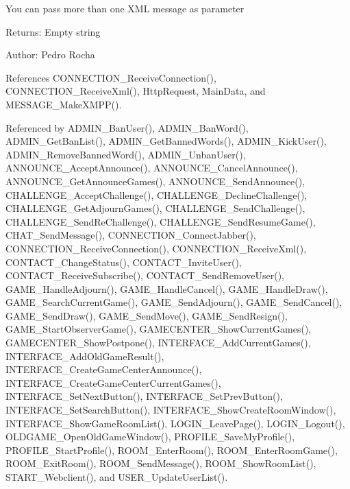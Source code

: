 You can pass more than one XML message as parameter

\begin{Desc}
\item[Returns:]Empty string \end{Desc}
\begin{Desc}
\item[Author:]Pedro Rocha \end{Desc}


References CONNECTION\_\-ReceiveConnection(), CONNECTION\_\-ReceiveXml(), HttpRequest, MainData, and MESSAGE\_\-MakeXMPP().

Referenced by ADMIN\_\-BanUser(), ADMIN\_\-BanWord(), ADMIN\_\-GetBanList(), ADMIN\_\-GetBannedWords(), ADMIN\_\-KickUser(), ADMIN\_\-RemoveBannedWord(), ADMIN\_\-UnbanUser(), ANNOUNCE\_\-AcceptAnnounce(), ANNOUNCE\_\-CancelAnnounce(), ANNOUNCE\_\-GetAnnounceGames(), ANNOUNCE\_\-SendAnnounce(), CHALLENGE\_\-AcceptChallenge(), CHALLENGE\_\-DeclineChallenge(), CHALLENGE\_\-GetAdjournGames(), CHALLENGE\_\-SendChallenge(), CHALLENGE\_\-SendReChallenge(), CHALLENGE\_\-SendResumeGame(), CHAT\_\-SendMessage(), CONNECTION\_\-ConnectJabber(), CONNECTION\_\-ReceiveConnection(), CONNECTION\_\-ReceiveXml(), CONTACT\_\-ChangeStatus(), CONTACT\_\-InviteUser(), CONTACT\_\-ReceiveSubscribe(), CONTACT\_\-SendRemoveUser(), GAME\_\-HandleAdjourn(), GAME\_\-HandleCancel(), GAME\_\-HandleDraw(), GAME\_\-SearchCurrentGame(), GAME\_\-SendAdjourn(), GAME\_\-SendCancel(), GAME\_\-SendDraw(), GAME\_\-SendMove(), GAME\_\-SendResign(), GAME\_\-StartObserverGame(), GAMECENTER\_\-ShowCurrentGames(), GAMECENTER\_\-ShowPostpone(), INTERFACE\_\-AddCurrentGames(), INTERFACE\_\-AddOldGameResult(), INTERFACE\_\-CreateGameCenterAnnounce(), INTERFACE\_\-CreateGameCenterCurrentGames(), INTERFACE\_\-SetNextButton(), INTERFACE\_\-SetPrevButton(), INTERFACE\_\-SetSearchButton(), INTERFACE\_\-ShowCreateRoomWindow(), INTERFACE\_\-ShowGameRoomList(), LOGIN\_\-LeavePage(), LOGIN\_\-Logout(), OLDGAME\_\-OpenOldGameWindow(), PROFILE\_\-SaveMyProfile(), PROFILE\_\-StartProfile(), ROOM\_\-EnterRoom(), ROOM\_\-EnterRoomGame(), ROOM\_\-ExitRoom(), ROOM\_\-SendMessage(), ROOM\_\-ShowRoomList(), START\_\-Webclient(), and USER\_\-UpdateUserList().